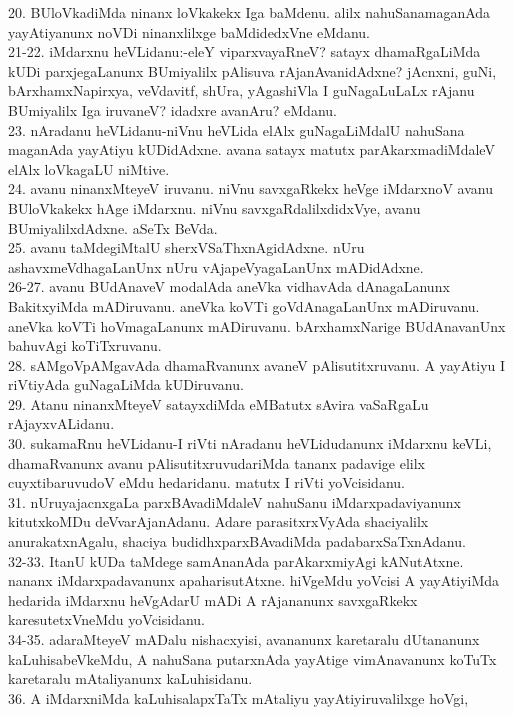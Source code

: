 \documentclass{article}
\begin{document}
20. BUloVkadiMda ninanx loVkakekx Iga baMdenu. alilx nahuSanamaganAda yayAtiyanunx noVDi ninanxlilxge baMdidedxVne eMdanu.\\
21-22. iMdarxnu heVLidanu:-eleY viparxvayaRneV? satayx dhamaRgaLiMda kUDi parxjegaLanunx BUmiyalilx pAlisuva rAjanAvanidAdxne? jAcnxni, guNi, bArxhamxNapirxya, veVdavitf, shUra, yAgashiVla I guNagaLuLaLx rAjanu BUmiyalilx Iga iruvaneV? idadxre avanAru? eMdanu.\\
23. nAradanu heVLidanu-niVnu heVLida elAlx guNagaLiMdalU nahuSana maganAda yayAtiyu kUDidAdxne. avana satayx matutx parAkarxmadiMdaleV elAlx loVkagaLU niMtive.\\
24. avanu ninanxMteyeV iruvanu. niVnu savxgaRkekx heVge iMdarxnoV avanu BUloVkakekx hAge iMdarxnu. niVnu savxgaRdalilxdidxVye, avanu BUmiyalilxdAdxne. aSeTx BeVda.\\
25. avanu taMdegiMtalU sherxVSaThxnAgidAdxne. nUru ashavxmeVdhagaLanUnx nUru vAjapeVyagaLanUnx mADidAdxne.\\
26-27. avanu BUdAnaveV modalAda aneVka vidhavAda dAnagaLanunx BakitxyiMda mADiruvanu. aneVka koVTi goVdAnagaLanUnx mADiruvanu. aneVka koVTi hoVmagaLanunx mADiruvanu. bArxhamxNarige BUdAnavanUnx bahuvAgi koTiTxruvanu.\\
28. sAMgoVpAMgavAda dhamaRvanunx avaneV pAlisutitxruvanu. A yayAtiyu I riVtiyAda guNagaLiMda kUDiruvanu.\\
29. Atanu ninanxMteyeV satayxdiMda eMBatutx sAvira vaSaRgaLu rAjayxvALidanu.\\
30. sukamaRnu heVLidanu-I riVti nAradanu heVLidudanunx iMdarxnu keVLi, dhamaRvanunx avanu pAlisutitxruvudariMda tananx padavige elilx cuyxtibaruvudoV eMdu hedaridanu. matutx I riVti yoVcisidanu.\\
31. nUruyajacnxgaLa parxBAvadiMdaleV nahuSanu iMdarxpadaviyanunx kitutxkoMDu deVvarAjanAdanu. Adare parasitxrxVyAda shaciyalilx anurakatxnAgalu, shaciya budidhxparxBAvadiMda padabarxSaTxnAdanu.\\
32-33. ItanU kUDa taMdege samAnanAda parAkarxmiyAgi kANutAtxne. nananx iMdarxpadavanunx apaharisutAtxne. hiVgeMdu yoVcisi A yayAtiyiMda hedarida iMdarxnu heVgAdarU mADi A rAjananunx savxgaRkekx karesutetxVneMdu yoVcisidanu.\\
34-35. adaraMteyeV mADalu nishacxyisi, avananunx karetaralu dUtananunx kaLuhisabeVkeMdu, A nahuSana putarxnAda yayAtige vimAnavanunx koTuTx karetaralu mAtaliyanunx kaLuhisidanu.\\
36. A iMdarxniMda kaLuhisalapxTaTx mAtaliyu yayAtiyiruvalilxge hoVgi,\\
\end{document}
